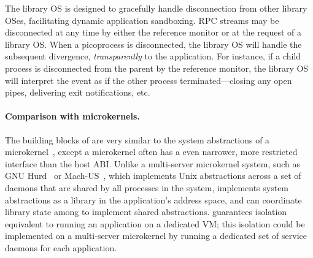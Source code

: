 

The \graphene{} library OS is designed to gracefully handle disconnection from other library OSes, facilitating dynamic application sandboxing.
RPC streams may be disconnected at any time by either the reference monitor or at the request of a library OS.
When a picoprocess is disconnected, the library OS will handle the subsequent
divergence, %
{\em transparently} to the application.
For instance, if a child process is disconnected from the parent by the reference monitor, the library OS will interpret the event as if the other process terminated---closing any open pipes, delivering exit notifications, etc.



\paragraph{Comparison with microkernels.}
The building blocks of \graphene{} are very similar to the system abstractions of a 
microkernel~\cite{liedtke95sosp,klein09sel4,elphinstone13microkernels,liedtke93sosp,chen93memory,baron1985mach-1,accetta86mach}, except a microkernel often has a even narrower, more restricted interface than the host ABI.
Unlike a multi-server microkernel system, such as GNU Hurd~\cite{hurd} or Mach-US~\cite{stevenson95mach-us}, which implements Unix abstractions across a set of daemons that are shared by all processes in the system, \graphene{} implements system abstractions as a library in the application's address space, and can coordinate library state among \picoprocs{} to implement shared abstractions. \graphene{} guarantees isolation equivalent to running 
an application on a dedicated VM; this isolation could be implemented on a multi-server microkernel by running a dedicated set of service daemons for each application.

